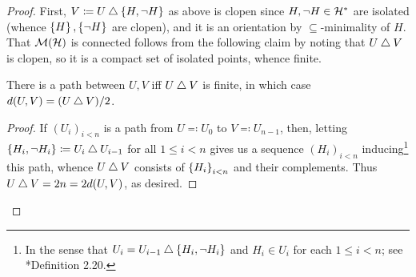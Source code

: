 \documentclass{amsart}
\begin{document}
    \begin{proof}
        First, $V\coloneqq U\bigtriangleup\left\{H,\lnot H\right\}$ as above is clopen since $H,\lnot H\in\mathcal{H}^\ast$ are isolated (whence $\left\{H\right\},\left\{\lnot H\right\}$ are clopen), and it is an orientation by $\subseteq$-minimality of $H$. That $\mathcal{M}(\mathcal{H})$ is connected follows from the following claim by noting that $U\bigtriangleup V$ is clopen, so it is a compact set of isolated points, whence finite.
        \begin{center}
            \begin{minipage}{0.95\textwidth}
                \begin{claim*}
                    There is a path between $U,V$ iff $U\bigtriangleup V$ is finite, in which case $d(U,V)=(U\bigtriangleup V)/2$.
                \end{claim*}
                \begin{proof}
                    If $(U_i)_{i<n}$ is a path from $U\eqqcolon U_0$ to $V\eqqcolon U_{n-1}$, then, letting $\left\{H_i,\lnot H_i\right\}\coloneqq U_i\bigtriangleup U_{i-1}$ for all $1\leq i<n$ gives us a sequence $(H_i)_{i<n}$ inducing\footnote{In the sense that $U_i=U_{i-1}\bigtriangleup\left\{H_i,\lnot H_i\right\}$ and $H_i\in U_i$ for each $1\leq i<n$; see \cite{Tse20}*{Definition 2.20}.} this path, whence $U\bigtriangleup V$ consists of $\left\{H_i\right\}_{i<n}$ and their complements. Thus $U\bigtriangleup V=2n=2d(U,V)$, as desired.


\end{proof}
\end{minipage}
\end{center}
\end{proof}
\end{document}
